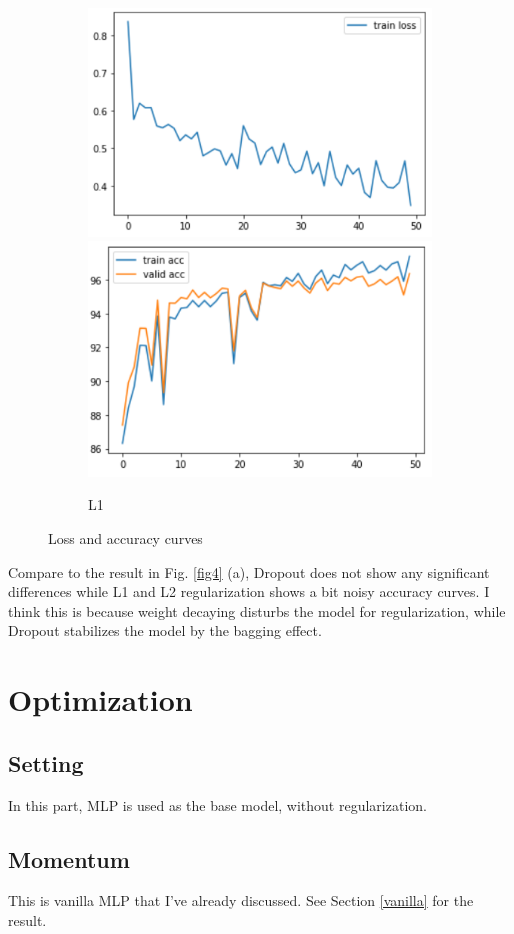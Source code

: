 \documentclass[11pt]{article}
\begin{document}
\begin{figure}[H]
        \begin{subfigure}[H]{1\textwidth}
            \includegraphics[width=0.5\linewidth]{img/L1/loss.PNG}
            \includegraphics[width=0.5\linewidth]{img/L1/acc.PNG}
            \caption{L1}
        \end{subfigure}
        \caption{Loss and accuracy curves}
        \label{fig11}
    \end{figure}
    Compare to the result in Fig. \ref{fig4} (a), Dropout does not show any significant differences while L1 and L2 regularization shows a bit noisy accuracy curves. I think this is because weight decaying disturbs the model for regularization, while Dropout stabilizes the model by the bagging effect.

\section{Optimization}
\setcounter{subsection}{-1}
\subsection{Setting}
    In this part, MLP is used as the base model, without regularization.
    
\subsection{Momentum}
    This is vanilla MLP that I've already discussed. See Section \ref{vanilla} for the result.
\end{document}
